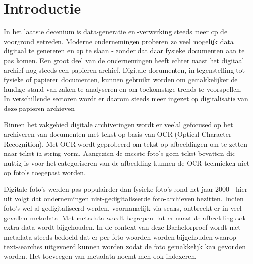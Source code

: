 
\section{Introductie} %
\label{sec:introductie}
In het laatste decenium is data-generatie en -verwerking steeds meer op de voorgrond getreden. Moderne ondernemingen proberen zo veel mogelijk data digitaal te genereren en op te slaan - zonder dat daar fysieke documenten aan te pas komen. Een groot deel van de ondernemingen heeft echter naast het digitaal archief nog steeds een papieren archief.
Digitale documenten, in tegenstelling tot fysieke of papieren documenten, kunnen gebruikt worden om gemakkelijker de huidige stand van zaken te analyseren en om toekomstige trends te voorspellen. In verschillende sectoren wordt er daarom steeds meer ingezet op digitalisatie van deze papieren archieven \autocite{PekkaLeviaekangas2020}. 

Binnen het vakgebied digitale archiveringen wordt er veelal gefocused op het archiveren van documenten met tekst op basis van OCR (Optical Character Recognition). Met OCR wordt geprobeerd om tekst op afbeeldingen om te zetten naar tekst in string vorm. Aangezien de meeste foto's geen tekst bevatten die nuttig is voor het categoriseren van de afbeelding kunnen de OCR technieken niet op foto's toegepast worden.

Digitale foto's werden pas populairder dan fysieke foto's rond het jaar 2000 \autocite{HenryC.LucasJr.2009} - hier uit volgt dat ondernemingen niet-gedigitaliseerde foto-archieven bezitten. Indien foto's wel al gedigitaliseerd werden, voornamelijk via scans, ontbreekt er in veel gevallen metadata. Met metadata wordt begrepen dat er naast de afbeelding ook extra data wordt bijgehouden. In de context van deze Bachelorproef wordt met metadata steeds bedoeld dat er per foto woorden worden bijgehouden waarop text-searches uitgevoerd kunnen worden zodat de foto gemakkelijk kan gevonden worden. Het toevoegen van metadata noemt men ook indexeren.

